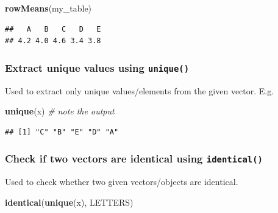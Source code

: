 \documentclass[
]{book}
\newenvironment{Shaded}{\begin{snugshade}}{\end{snugshade}}
\newcommand{\CommentTok}[1]{\textcolor[rgb]{0.56,0.35,0.01}{\textit{#1}}}
\newcommand{\FunctionTok}[1]{\textcolor[rgb]{0.13,0.29,0.53}{\textbf{#1}}}
\newcommand{\NormalTok}[1]{#1}
\begin{document}
\begin{Shaded}
\begin{Highlighting}[]
\FunctionTok{rowMeans}\NormalTok{(my\_table)}
\end{Highlighting}
\end{Shaded}

\begin{verbatim}
##   A   B   C   D   E 
## 4.2 4.0 4.6 3.4 3.8
\end{verbatim}

\hypertarget{extract-unique-values-using-unique}{%
\subsubsection*{\texorpdfstring{Extract unique values using \texttt{unique()}}{Extract unique values using unique()}}\label{extract-unique-values-using-unique}}

Used to extract only unique values/elements from the given vector. E.g.

\begin{Shaded}
\begin{Highlighting}[]
\FunctionTok{unique}\NormalTok{(x) }\CommentTok{\# note the output}
\end{Highlighting}
\end{Shaded}

\begin{verbatim}
## [1] "C" "B" "E" "D" "A"
\end{verbatim}

\hypertarget{check-if-two-vectors-are-identical-using-identical}{%
\subsubsection*{\texorpdfstring{Check if two vectors are identical using \texttt{identical()}}{Check if two vectors are identical using identical()}}\label{check-if-two-vectors-are-identical-using-identical}}

Used to check whether two given vectors/objects are identical.

\begin{Shaded}
\begin{Highlighting}[]
\FunctionTok{identical}\NormalTok{(}\FunctionTok{unique}\NormalTok{(x), LETTERS)}
\end{Highlighting}
\end{Shaded}
\end{document}
